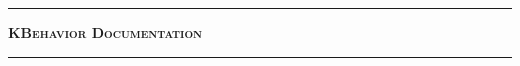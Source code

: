 \thispagestyle{empty}
\begin{titlepage}



  \hspace{6.2cm}

    \vspace{1.5cm}

  \begin{center}
    \hrule height 2pt
    \vspace{0.3cm}
      \scshape \huge \textbf{KBehavior Documentation}\\

    \vspace{0.3cm}
    \hrule height 2pt
    \end{center}

\vspace{3.7cm}




\end{titlepage}


\thispagestyle{empty} \vspace{0.1cm} \hspace{0.2cm}
\clearpage{\pagestyle{empty}\cleardoublepage}
